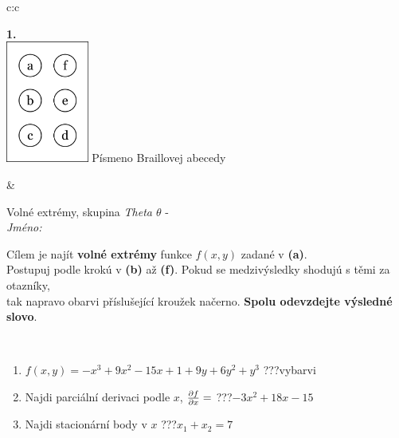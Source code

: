 \documentclass[10pt]{report}
\begin{document}
\begin{tabular}{c:c}
\begin{minipage}[c][104.5mm][t]{0.5\linewidth}
\begin{center}
\begin{minipage}{0.20\linewidth}
\begin{center}
{\Huge\bfseries 1.} \\[2mm]
\includegraphics[height=40mm]{../images/braille.png}
{\small Písmeno Braillovej abecedy}
\end{center}
\end{minipage}
\end{center}
\end{minipage}
&
\begin{minipage}[c][104.5mm][t]{0.5\linewidth}
\begin{center}
\vspace{7mm}
{\huge Volné extrémy, skupina \textit{Theta $\theta$} -}\\[5mm]
\textit{Jméno:}\phantom{xxxxxxxxxxxxxxxxxxxxxxxxxxxxxxxxxxxxxxxxxxxxxxxxxxxxxxxxxxxxxxxxx}\\[5mm]
\begin{minipage}{0.95\linewidth}
\begin{center}
Cílem je najít \textbf{volné extrémy} funkce $f(x,y)$ zadané v \textbf{(a)}.\\Postupuj podle krokú v \textbf{(b)} až \textbf{(f)}. Pokud se medzivýsledky shodujú s těmi za otazníky,\\tak napravo obarvi příslušející kroužek načerno. \textbf{Spolu odevzdejte výsledné slovo}.
\end{center}
\end{minipage}
\\[1mm]
\begin{minipage}{0.79\linewidth}
\begin{center}
\begin{varwidth}{\linewidth}
\begin{enumerate}
\normalsize
\item $f(x,y)=-x^3+9x^2-15x+1+9y+6y^2+y^3$\quad \dotfill\; ???\;\dotfill \quad vybarvi
\item Najdi parciální derivaci podle $x$, $\pdv{f}{x}=$\quad \dotfill\; ???\;\dotfill \quad $-3x^2+18x-15$
\item Najdi stacionární body v $x$\quad \dotfill\; ???\;\dotfill \quad $x_1+x_2=7$

\end{enumerate}
\end{varwidth}
\end{center}
\end{minipage}
\end{center}
\end{minipage}
\end{tabular}
\end{document}
